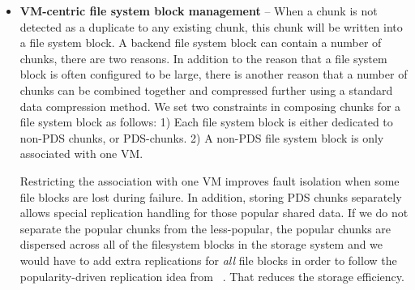 \begin{itemize}

\item 
\textbf{VM-centric file system block management} --
When a chunk is not detected as a duplicate to any existing chunk, this chunk will be written
into a file system block.  A  backend file system block can contain a number of chunks,
there are   two reasons. In addition to the reason that a file system block is often
configured to be large, there is another reason that a number of chunks can be combined together
and compressed further using a standard data compression method. 
We set two constraints in composing chunks for a file system block as follows:
1) Each file system block is either dedicated to non-PDS chunks, or PDS-chunks.
2) A non-PDS file system block is only associated with one VM.

Restricting the association with one VM improves fault isolation when some file blocks are lost during failure. 
In addition, storing PDS chunks separately allows special replication handling for those popular shared data. 
If we do not separate the
popular chunks from the less-popular, the popular chunks are dispersed across
all of the filesystem blocks in the storage system and we would have
to add extra replications for {\em all} file blocks in order to   follow the popularity-driven replication idea 
from ~\cite{Reliability06}. That reduces the storage efficiency.


\end{itemize}


